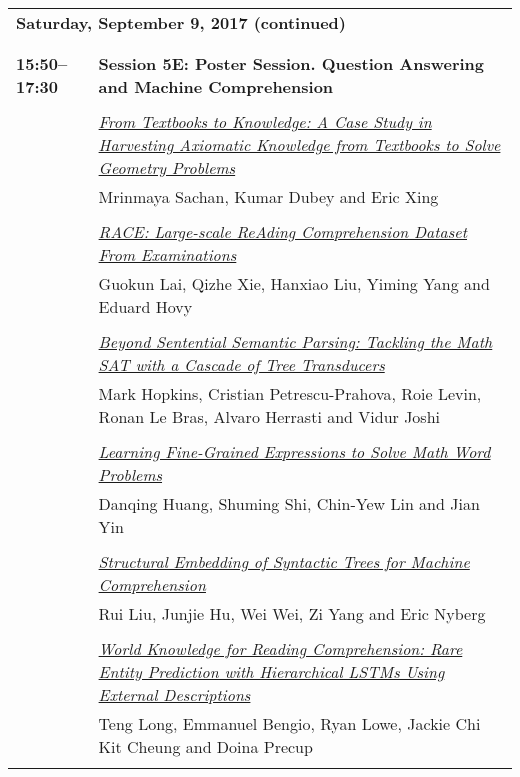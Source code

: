 \begin{tabular}{p{20mm}p{128mm}}
\\
\multicolumn{2}{l}{\bf Saturday, September 9, 2017 (continued)} \\\\
\\{\bf 15:50--17:30} & {\bf Session 5E: Poster Session. Question Answering and Machine Comprehension } \\
\\
 & \hyperlink{page.782}{\em From Textbooks to Knowledge: A Case Study in Harvesting Axiomatic Knowledge from Textbooks to Solve Geometry Problems}\\
         & Mrinmaya Sachan, Kumar Dubey and Eric Xing \\
\\

 & \hyperlink{page.794}{\em RACE: Large-scale ReAding Comprehension Dataset From Examinations}\\
         & Guokun Lai, Qizhe Xie, Hanxiao Liu, Yiming Yang and Eduard Hovy \\
\\

 & \hyperlink{page.804}{\em Beyond Sentential Semantic Parsing: Tackling the Math SAT with a Cascade of Tree Transducers}\\
         & Mark Hopkins, Cristian Petrescu-Prahova, Roie Levin, Ronan Le Bras, Alvaro Herrasti and Vidur Joshi \\
\\

 & \hyperlink{page.814}{\em Learning Fine-Grained Expressions to Solve Math Word Problems}\\
         & Danqing Huang, Shuming Shi, Chin-Yew Lin and Jian Yin \\
\\

 & \hyperlink{page.824}{\em Structural Embedding of Syntactic Trees for Machine Comprehension}\\
         & Rui Liu, Junjie Hu, Wei Wei, Zi Yang and Eric Nyberg \\
\\

 & \hyperlink{page.834}{\em World Knowledge for Reading Comprehension: Rare Entity Prediction with Hierarchical LSTMs Using External Descriptions}\\
         & Teng Long, Emmanuel Bengio, Ryan Lowe, Jackie Chi Kit Cheung and Doina Precup \\
\\


\end{tabular}
